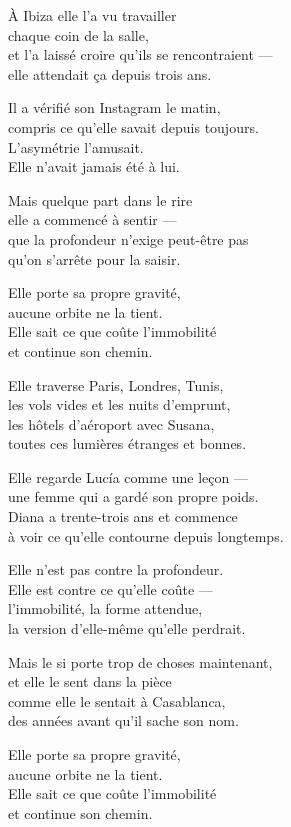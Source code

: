 \begin{lyrics}
À Ibiza elle l'a vu travailler\\
chaque coin de la salle,\\
et l'a laissé croire qu'ils se rencontraient —\\
elle attendait ça depuis trois ans.

Il a vérifié son Instagram le matin,\\
compris ce qu'elle savait depuis toujours.\\
L'asymétrie l'amusait.\\
Elle n'avait jamais été à lui.

Mais quelque part dans le rire\\
elle a commencé à sentir —\\
que la profondeur n'exige peut-être pas\\
qu'on s'arrête pour la saisir.


Elle porte sa propre gravité,\\
aucune orbite ne la tient.\\
Elle sait ce que coûte l'immobilité\\
et continue son chemin.

Elle traverse Paris, Londres, Tunis,\\
les vols vides et les nuits d'emprunt,\\
les hôtels d'aéroport avec Susana,\\
toutes ces lumières étranges et bonnes.

Elle regarde Lucía comme une leçon —\\
une femme qui a gardé son propre poids.\\
Diana a trente-trois ans et commence\\
à voir ce qu'elle contourne depuis longtemps.

Elle n'est pas contre la profondeur.\\
Elle est contre ce qu'elle coûte —\\
l'immobilité, la forme attendue,\\
la version d'elle-même qu'elle perdrait.

Mais le si porte trop de choses maintenant,\\
et elle le sent dans la pièce\\
comme elle le sentait à Casablanca,\\
des années avant qu'il sache son nom.


Elle porte sa propre gravité,\\
aucune orbite ne la tient.\\
Elle sait ce que coûte l'immobilité\\
et continue son chemin.

\end{lyrics}


